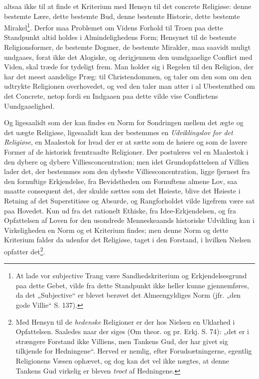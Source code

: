 \documentclass[12pt,a4paper]{book}
\newcommand{\opage}[1]{\marginnote{\footnotesize\textit{[#1]}}}
\begin{document}
altsaa ikke til at finde et Kriterium med Hensyn til det concrete Religiøse: denne bestemte Lære,
dette bestemte Bud, denne bestemte Historie, dette bestemte Mirakel\footnote{At lade vor
subjective Trang være Sandhedskriterium og Erkjendelsesgrund paa dette Gebet, vilde fra dette
Standpunkt ikke heller kunne gjennemføres, da det „Subjective“ er blevet berøvet det
Almeengyldiges Norm (jfr. „den gode Villie“ S. 137).}. Derfor maa Problemet om Videns Forhold til
Troen paa dette Standpunkt altid holdes i Almindelighedens Form; Hensynet til de bestemte
Religionsformer, de bestemte Dogmer, de bestemte Mirakler, maa saavidt muligt undgaaes, forat
ikke det Alogiske, og derigjennem den uundgaaelige Conflict med Viden, skal træde for tydeligt
frem. Man holder sig i Regelen til den Religion, der har det meest aandelige Præg: til
Christendommen, og taler om den som om den udtrykte Religionen overhovedet, og ved den taler man
atter i al Ubestemthed om det Concrete, netop fordi en Indgaaen paa dette vilde vise Conflictens
Uundgaaelighed.

\opage{202}Og ligesaalidt som der kan findes en Norm for Sondringen mellem det ægte og det uægte Religiøse,
ligesaalidt kan der bestemmes en \emph{Udviklingslov for det Religiøse}, en Maalestok for hvad
der er at sætte som de høiere og som de lavere Former af de historisk fremtraadte Religioner. Der
postuleres vel en Maalestok i den dybere og dybere Villiesconcentration; men idet
Grundopfattelsen af Villien lader det, der bestemmes som den dybeste Villiesconcentration, ligge
fjernest fra den fornuftige Erkjendelse, fra Bevidstheden om Fornuftens almene Lov, saa maatte
consequent det, der skulde sættes som det Høieste, blive det Høieste i Retning af det
Superstitiøse og Absurde, og Rangforholdet vilde ligefrem være sat paa Hovedet. Kun ud fra det
rationelt Ethiske, fra Idee-Erkjendelsen, og fra Opfattelsen af Loven for den usondrede
Menneskeaands historiske Udvikling kan i Virkeligheden en Norm og et Kriterium findes; men denne
Norm og dette Kriterium falder da udenfor det Religiøse, taget i den Forstand, i hvilken Nielsen
opfatter det\footnote{Med Hensyn til de \emph{hedenske} Religioner er der hos Nielsen en Uklarhed i
Opfattelsen. Saaledes naar der siges (Om theor. og pr. Erkj. S. 74): „det er i strængere
Forstand ikke Villiens, men Tankens Gud, der har givet sig tilkjende for Hedningene“. Herved er
nemlig, efter Forudsætningerne, egentlig Religionens Væsen ophævet, og dog kan det vel ikke
nægtes, at denne Tankens Gud virkelig er bleven \emph{troet} af Hedningene.}.
\end{document}
